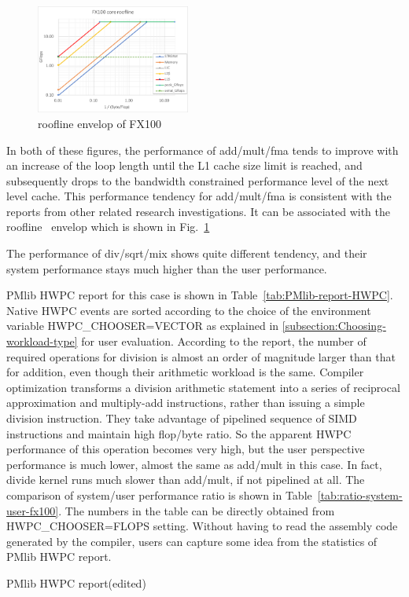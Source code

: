 \documentclass[conference]{IEEEtran}
\begin{document}
\begin{figure}[tb]
\includegraphics[width=0.45\textwidth]{figs/roofline-fx100.pdf}
\caption{roofline envelop of FX100}
\label{fig:roofline-fx100}
\end{figure}

In both of these figures,
the performance of add/mult/fma tends to improve with an increase of
the loop length until the L1 cache size limit is reached,
and subsequently drops to the bandwidth constrained performance level
of the next level cache.
This performance tendency for add/mult/fma is consistent with the reports
from other related research investigations.
It can be associated with the roofline~\cite{Williams:2009}
envelop which is shown in Fig.~\ref{fig:roofline-fx100}

The performance of div/sqrt/mix shows quite different tendency, and
their system performance stays much higher than the user performance.

PMlib HWPC report for this case is shown in Table~\ref{tab:PMlib-report-HWPC}.
Native HWPC events are sorted according to the choice of the
environment variable HWPC\_CHOOSER=VECTOR as explained in
\ref{subsection:Choosing-workload-type} for user evaluation.
According to the report,
the number of required operations for division is almost an order of magnitude
larger than that for addition, even though their arithmetic workload
is the same.
Compiler optimization transforms
a division arithmetic statement into a series of reciprocal
approximation and multiply-add instructions, rather than issuing
a simple division instruction. They take advantage of pipelined sequence of
SIMD instructions and maintain high flop/byte ratio.
So the apparent HWPC performance of this operation becomes very high,
but the user perspective performance is much lower, almost the same as
add/mult in this case. In fact, divide kernel runs much slower than add/mult,
if not pipelined at all.
The comparison of system/user performance ratio is shown in
Table~\ref{tab:ratio-system-user-fx100}. The numbers in the table can be
directly obtained from HWPC\_CHOOSER=FLOPS setting.
Without having to read the assembly code generated by the compiler,
users can capture some idea from the statistics of PMlib HWPC report.
\begin{table}[b]
\centering
\caption{PMlib HWPC report(edited)}
\label{tab:PMlib-report-HWPC}
\footnotesize

\end{table}
\end{document}
